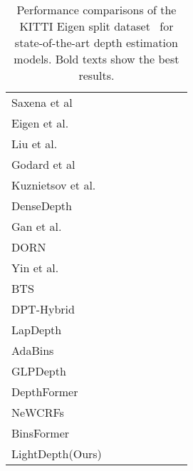 \documentclass{article}
\begin{document}
\begin{table*}[t]
\caption{Performance comparisons of the KITTI Eigen split dataset~\cite{eigen} for state-of-the-art depth estimation models. Bold texts show the best results.}
\label{tab:metrics}
    \begin{center}
    \begin{tabular}{lccccccc}
     &  &  &  &   &  &  &  \\
    \hline
    Saxena et al~\cite{saxena} &  &  &  &  &  &  & \\
    Eigen et al.~\cite{eigen} &  &  &  &  &  &  & \\
    Liu et al.~\cite{liu} &  &  &  &  &  &  & \\
    Godard et al~\cite{godard} &  &  &  &  &  &  & \\
    Kuznietsov et al.~\cite{semi} &  &  &  &  &  &  & \\
    DenseDepth~\cite{alhashim2018high} &  &  &  &  &  &  & \\
    Gan et al.~\cite{gan} &  &  &  &  &  &  & \\
    DORN~\cite{dorn} &  &  &  &  &  &  & \\
    Yin et al.~\cite{yin} &  &  &  &  &  &  & \\
    BTS~\cite{bts} &  &  &  &  &  &  & \\
    DPT-Hybrid~\cite{8dpt} &  &   &  &  &  &  & \\
    LapDepth~\cite{7lap} &  &   &  &  &  &  & \\
    AdaBins~\cite{adabins} &  &  &  &  &  &  & \\
    GLPDepth~\cite{5glp} &  &   &  &  & &   & \\
    DepthFormer~\cite{3depthformer} &  &  &  &  &  &  & \\ 
    NeWCRFs~\cite{2new} &   &  &  &  &  &  & \\
    BinsFormer~\cite{1binsformer} &  &  &  &  &  &  & \\
    LightDepth(Ours) &  &  &  &  &  &  & \\
    \hline
    \end{tabular}
    \end{center}
\end{table*}
\end{document}
